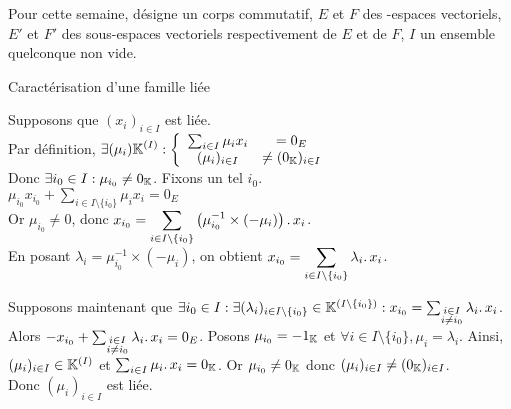 \documentclass{article}
\date{25 Mars 2024}
\begin{document}
\maketitle

Pour cette semaine, \K désigne un corps commutatif, $E$ et $F$ des \K\!\!-espaces vectoriels, $E'$ et $F'$ des sous-espaces vectoriels respectivement de $E$ et de $F$, $I$ un ensemble quelconque non vide.

\begin{question_kholle}
	[Une famille est liée si et seulement si l'un de ses vecteurs est une combinaison linéaires d'autres vecteurs de la famille.
		\begin{equation}
			(x_i)_{i \in I} \text{ est liée}
			\iff \exists i_0 \in I : \exists (\lambda_i)_{i \in I\setminus\{i_0\}} \in \K^{\left( I \setminus \{i_0\} \right)} :
			x_{i_0} = \sum_{\substack{i \in I \\ i \neq i_0}} \lambda_i \ldotp x_i
		\end{equation}]
	{Caractérisation d'une famille liée}

	Supposons que $(x_i)_{i \in I}$ est liée. \\
	Par définition, $\displaystyle \exists (\mu_i) \mathbb K^{(I)} :
		\left\{ \begin{array}{ccc}
			\sum_{i \in I} \mu_i x_i & = 0_E                 \\
			(\mu_i)_{i \in I}        & \neq (0_{\mathbb K})_{i \in I}
		\end{array} \right.$ \\
	Donc $\exists i_0 \in I : \mu_{i_0} \neq 0_{\mathbb K}$. Fixons un tel $i_0$. \\
	$\displaystyle \mu_{i_0} x_{i_0} + \sum_{i \in I \setminus \{i_0\}} \mu_i x_i = 0_E$ \\
	Or $\mu_{i_0} \neq 0$, donc $\displaystyle x_{i_0} = \sum_{i \in I \setminus \{i_0\}} \left( \mu_{i_0}^{-1} \times (-\mu_i) \right) \ldotp x_i$. \\
	En posant $\lambda_i = \mu_{i_0}^{-1} \times (-\mu_i)$, on obtient $x_{i_0} = \displaystyle \sum_{i \in I \setminus \{i_0\}} \lambda_i \ldotp x_i$.

	Supposons maintenant que $\exists i_0 \in I : \exists (\lambda_i)_{i \in I\setminus\{i_0\}} \in \mathbb K^{\left( I \setminus \{i_0\} \right)} :
		x_{i_0} = \sum_{\substack{i \in I \\ i \neq i_0}} \lambda_i \ldotp x_i$. \\
	Alors $-x_{i_0} + \sum_{\substack{i \in I \\ i \neq i_0}} \lambda_i \ldotp x_i = 0_E$.
	Posons $\mu_{i_0} = - 1_{\mathbb K}$ et $\forall i \in I \!\setminus\! \{i_0\}, \mu_i = \lambda_i$.
	Ainsi, $(\mu_i)_{i \in I} \in \mathbb K^{(I)}$ et $\sum_{i \in I} \mu_i \ldotp x_i = 0_{\mathbb K}$. Or $\mu_{i_0} \neq 0_{\mathbb K}$ donc $(\mu_i)_{i \in I} \neq (0_{\mathbb K})_{i \in I}$. \\
	Donc $(\mu_i)_{i \in I}$ est liée.
\end{question_kholle}
\end{document}
